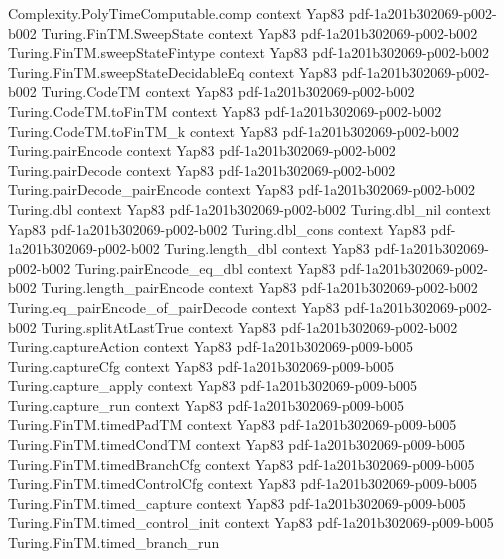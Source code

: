 \begin{theorem}
\proofstep
  {Complexity.PolyTimeComputable.comp}
  {context}
  {Yap83}
  {pdf-1a201b302069-p002-b002}
\proofstep
  {Turing.FinTM.SweepState}
  {context}
  {Yap83}
  {pdf-1a201b302069-p002-b002}
\proofstep
  {Turing.FinTM.sweepStateFintype}
  {context}
  {Yap83}
  {pdf-1a201b302069-p002-b002}
\proofstep
  {Turing.FinTM.sweepStateDecidableEq}
  {context}
  {Yap83}
  {pdf-1a201b302069-p002-b002}
\proofstep
  {Turing.CodeTM}
  {context}
  {Yap83}
  {pdf-1a201b302069-p002-b002}
\proofstep
  {Turing.CodeTM.toFinTM}
  {context}
  {Yap83}
  {pdf-1a201b302069-p002-b002}
\proofstep
  {Turing.CodeTM.toFinTM_k}
  {context}
  {Yap83}
  {pdf-1a201b302069-p002-b002}
\proofstep
  {Turing.pairEncode}
  {context}
  {Yap83}
  {pdf-1a201b302069-p002-b002}
\proofstep
  {Turing.pairDecode}
  {context}
  {Yap83}
  {pdf-1a201b302069-p002-b002}
\proofstep
  {Turing.pairDecode_pairEncode}
  {context}
  {Yap83}
  {pdf-1a201b302069-p002-b002}
\proofstep
  {Turing.dbl}
  {context}
  {Yap83}
  {pdf-1a201b302069-p002-b002}
\proofstep
  {Turing.dbl_nil}
  {context}
  {Yap83}
  {pdf-1a201b302069-p002-b002}
\proofstep
  {Turing.dbl_cons}
  {context}
  {Yap83}
  {pdf-1a201b302069-p002-b002}
\proofstep
  {Turing.length_dbl}
  {context}
  {Yap83}
  {pdf-1a201b302069-p002-b002}
\proofstep
  {Turing.pairEncode_eq_dbl}
  {context}
  {Yap83}
  {pdf-1a201b302069-p002-b002}
\proofstep
  {Turing.length_pairEncode}
  {context}
  {Yap83}
  {pdf-1a201b302069-p002-b002}
\proofstep
  {Turing.eq_pairEncode_of_pairDecode}
  {context}
  {Yap83}
  {pdf-1a201b302069-p002-b002}
\proofstep
  {Turing.splitAtLastTrue}
  {context}
  {Yap83}
  {pdf-1a201b302069-p002-b002}
\proofstep
  {Turing.captureAction}
  {context}
  {Yap83}
  {pdf-1a201b302069-p009-b005}
\proofstep
  {Turing.captureCfg}
  {context}
  {Yap83}
  {pdf-1a201b302069-p009-b005}
\proofstep
  {Turing.capture_apply}
  {context}
  {Yap83}
  {pdf-1a201b302069-p009-b005}
\proofstep
  {Turing.capture_run}
  {context}
  {Yap83}
  {pdf-1a201b302069-p009-b005}
\proofstep
  {Turing.FinTM.timedPadTM}
  {context}
  {Yap83}
  {pdf-1a201b302069-p009-b005}
\proofstep
  {Turing.FinTM.timedCondTM}
  {context}
  {Yap83}
  {pdf-1a201b302069-p009-b005}
\proofstep
  {Turing.FinTM.timedBranchCfg}
  {context}
  {Yap83}
  {pdf-1a201b302069-p009-b005}
\proofstep
  {Turing.FinTM.timedControlCfg}
  {context}
  {Yap83}
  {pdf-1a201b302069-p009-b005}
\proofstep
  {Turing.FinTM.timed_capture}
  {context}
  {Yap83}
  {pdf-1a201b302069-p009-b005}
\proofstep
  {Turing.FinTM.timed_control_init}
  {context}
  {Yap83}
  {pdf-1a201b302069-p009-b005}
\proofstep
  {Turing.FinTM.timed_branch_run}

\end{theorem}
